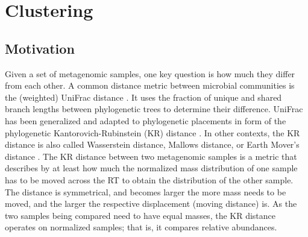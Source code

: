 
\chapter{Clustering}
\label{ch:Clustering}




\section{Motivation}
\label{ch:Clustering:sec:Motivation}

Given a set of metagenomic samples, one key question is how much they differ from each other.
A common distance metric between microbial communities
is the (weighted) UniFrac distance \cite{Lozupone2005,Lozupone2007a}.
It uses the fraction of unique and shared branch lengths between phylogenetic trees to determine their difference.
UniFrac has been generalized and adapted to phylogenetic placements
in form of the phylogenetic Kantorovich-Rubinstein (KR) distance \cite{Matsen2011a,Evans2012}.
In other contexts, the KR distance is also called Wasserstein distance, Mallows distance, or Earth Mover's distance
\cite{Mallows1972,Rachev1985,Levina2001,Villani2008}.
The KR distance between two metagenomic samples is a metric that describes
by at least how much the normalized mass distribution of one sample has to be moved across the \ac{RT}
to obtain the distribution of the other sample.
The distance is symmetrical, and becomes larger the more mass needs to be moved,
and the larger the respective displacement (moving distance) is.
As the two samples being compared need to have equal masses,
the KR distance operates on normalized samples;
that is, it compares relative abundances.

